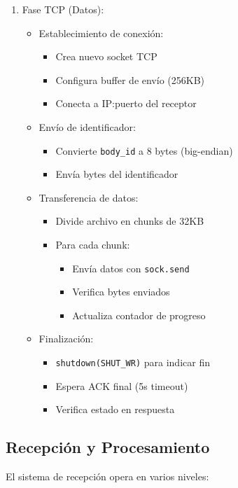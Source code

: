 \documentclass[12pt]{article}
\begin{document}
\begin{enumerate}
    \item Fase TCP (Datos):
    \begin{itemize}
        \item Establecimiento de conexión:
        \begin{itemize}
            \item Crea nuevo socket TCP
            \item Configura buffer de envío (256KB)
            \item Conecta a IP:puerto del receptor
        \end{itemize}
        \item Envío de identificador:
        \begin{itemize}
            \item Convierte \texttt{body\_id} a 8 bytes (big-endian)
            \item Envía bytes del identificador
        \end{itemize}
        \item Transferencia de datos:
        \begin{itemize}
            \item Divide archivo en chunks de 32KB
            \item Para cada chunk:
            \begin{itemize}
                \item Envía datos con \texttt{sock.send}
                \item Verifica bytes enviados
                \item Actualiza contador de progreso
            \end{itemize}
        \end{itemize}
        \item Finalización:
        \begin{itemize}
            \item \texttt{shutdown(SHUT\_WR)} para indicar fin
            \item Espera ACK final (5s timeout)
            \item Verifica estado en respuesta
        \end{itemize}
    \end{itemize}
\end{enumerate}

\subsection{Recepción y Procesamiento}
El sistema de recepción opera en varios niveles:
\end{document}
